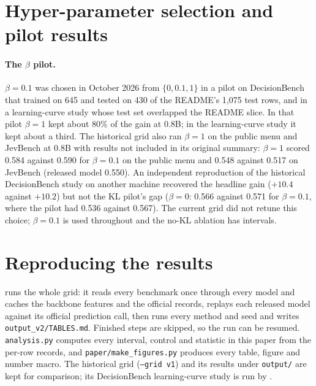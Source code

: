 \section{Hyper-parameter selection and pilot results}
\label{app:pilot}
\paragraph{The $\beta$ pilot.} $\beta=0.1$ was chosen in October 2026 from $\{0, 0.1, 1\}$ in a pilot on DecisionBench that trained on 645 and tested on 430 of the README's 1,075 test rows, and in a learning-curve study whose test set overlapped the README slice. In that pilot $\beta=1$ kept about 80\% of the gain at 0.8B; in the learning-curve study it kept about a third. The historical grid also ran $\beta=1$ on the public menu and JevBench at 0.8B with results not included in its original summary: $\beta=1$ scored 0.584 against 0.590 for $\beta=0.1$ on the public menu and 0.548 against 0.517 on JevBench (released model 0.550). An independent reproduction of the historical DecisionBench study on another machine recovered the headline gain ($+10.4$ against $+10.2$) but not the KL pilot's gap ($\beta=0$: 0.566 against 0.571 for $\beta=0.1$, where the pilot had 0.536 against 0.567). The current grid did not retune this choice; $\beta=0.1$ is used throughout and the no-KL ablation has intervals.

\section{Reproducing the results}
\label{app:repro}
 runs the whole grid: it reads every benchmark once through every model and caches the backbone features and the official records, replays each released model against its official prediction call, then runs every method and seed and writes \texttt{output\_v2/TABLES.md}. Finished steps are skipped, so the run can be resumed. \texttt{analysis.py} computes every interval, control and statistic in this paper from the per-row records, and \texttt{paper/make\_figures.py} produces every table, figure and number macro. The historical grid (\texttt{--grid v1}) and its results under \texttt{output/} are kept for comparison; its DecisionBench learning-curve study is run by .

